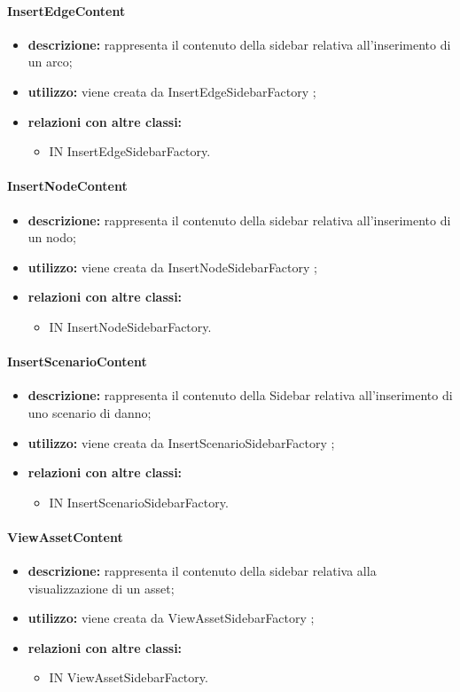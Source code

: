 \paragraph{InsertEdgeContent}
\begin{itemize}
	\item \textbf{descrizione:} rappresenta il contenuto della sidebar relativa all'inserimento di un arco;
	\item \textbf{utilizzo:} viene creata da InsertEdgeSidebarFactory ;
	\item \textbf{relazioni con altre classi:} 
	\begin{itemize}
		\item IN InsertEdgeSidebarFactory.
	\end{itemize}
\end{itemize}
\paragraph{InsertNodeContent}
\begin{itemize}
	\item \textbf{descrizione:} rappresenta il contenuto della sidebar relativa all'inserimento di un nodo;
	\item \textbf{utilizzo:} viene creata da InsertNodeSidebarFactory ;
	\item \textbf{relazioni con altre classi:} 
	\begin{itemize}
		\item IN InsertNodeSidebarFactory.
	\end{itemize}
\end{itemize}
\paragraph{InsertScenarioContent}
\begin{itemize}
	\item \textbf{descrizione:} rappresenta il contenuto della Sidebar relativa all'inserimento di uno scenario di danno;
	\item \textbf{utilizzo:} viene creata da InsertScenarioSidebarFactory ;
	\item \textbf{relazioni con altre classi:} 
	\begin{itemize}
		\item IN InsertScenarioSidebarFactory.
	\end{itemize}
\end{itemize}
\paragraph{ViewAssetContent}
\begin{itemize}
	\item \textbf{descrizione:} rappresenta il contenuto della sidebar relativa alla visualizzazione di un asset;
	\item \textbf{utilizzo:} viene creata da ViewAssetSidebarFactory ;
	\item \textbf{relazioni con altre classi:} 
	\begin{itemize}
		\item IN ViewAssetSidebarFactory.
	\end{itemize}
\end{itemize}
